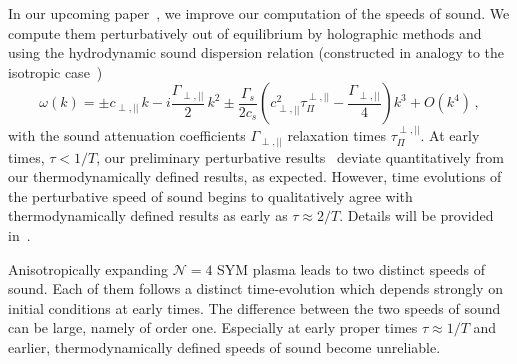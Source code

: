 \documentclass[preprint,12pt]{elsarticle}
\begin{document}
In our upcoming paper~\cite{Cartwright:2026}, we improve our computation of the speeds of sound. We compute them perturbatively out of equilibrium by holographic methods and using the hydrodynamic sound dispersion relation (constructed in analogy to the isotropic case~\cite{Baier:2007ix})
\begin{equation}
    \omega(k) = \pm c_{\perp,||} \, k - i \frac{\Gamma_{\perp,||}}{2} \, k^2 
    \pm\frac{\Gamma_s}{2 c_s} \left (
    c_{\perp,||}^2 \tau^{\perp,||}_\Pi-\frac{\Gamma_{\perp,||}}{4}
    \right ) k^3
    + O(k^4) \, ,
\end{equation}    
with the sound attenuation coefficients $\Gamma_{\perp,||}$ relaxation times $\tau^{\perp,||}_\Pi$. At early times, $\tau < 1/T$, our preliminary perturbative results~\cite{Cartwright:2026} deviate quantitatively from our thermodynamically defined results, as expected. However, time evolutions of the perturbative speed of sound begins to qualitatively agree with thermodynamically defined results as early as $\tau\approx 2/T$. Details will be provided in~\cite{Cartwright:2026}. 

\begin{mdframed}
    Anisotropically expanding $\mathcal{N}=4$ SYM plasma leads to two distinct speeds of sound. Each of them follows a distinct time-evolution which depends strongly on initial conditions at early times. The difference between the two speeds of sound can be large, namely of order one. Especially at early proper times $\tau \approx 1/T$ and earlier, thermodynamically defined speeds of sound become unreliable.   
\end{mdframed}
\end{document}
